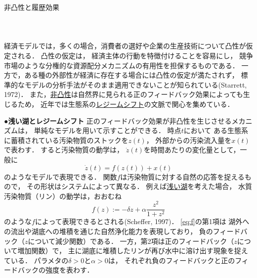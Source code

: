 \documentclass[11pt,a4paper]{article}
\begin{document}
\clearpage
\noindent
非凸性と履歴効果\\
\ \\
\ \\
\ \\

経済モデルでは，多くの場合，消費者の選好や企業の生産技術について凸性が仮定される．
凸性の仮定は，
経済主体の行動を特徴付けることを容易にし，
競争市場のような分権的な資源配分メカニズムの有用性を担保するものである．
一方で，ある種の外部性が経済に存在する場合には凸性の仮定が満たされず，
標準的なモデルの分析手法がそのまま適用できないことが知られている(Starrett, 1972)．
また，\underline{非凸性}は自然界に見られる正のフィードバック効果によっても生じるため，
近年では生態系の\underline{レジームシフト}の文脈で関心を集めている．

\noindent\textbf{●浅い湖とレジームシフト}\hspace{0.5em}
正のフィードバック効果が非凸性を生じさせるメカニズムは，
単純なモデルを用いて示すことができる．
時点$t$において
ある生態系に蓄積されている汚染物質のストックを$z(t)$，
外部からの汚染流入量を$x(t)$で表わす．
すると汚染物質の動学は，
$\dot{z}(t)$を時間あたりの変化量として，一般に
\begin{equation}\label{eq:z}%
  \dot{z}(t) = f(z(t)) + x(t)
\end{equation}
のようなモデルで表現できる．
関数$f$は汚染物質に対する自然の応答を捉えるもので，
その形状はシステムによって異なる．
例えば\underline{浅い湖}を考えた場合，
水質汚染物質（リン）の動学は，おおむね
\begin{equation}\label{eq:f}%
  f(z) := -\delta z + \alpha\frac{z^{2}}{1+z^{2}}
\end{equation}
のような$f$によって表現できるとされる(Scheffer, 1997)．
\eqref{eq:f}の第1項は
湖外への流出や湖底への堆積を通じた自然浄化能力を表現しており，
負のフィードバック（$z$について減少関数）である．
一方，第2項は正のフィードバック（$z$について増加関数）で，
主に湖底に堆積したリンが再び水中に溶け出す現象を捉えている．
パラメタの$\delta >0$と$\alpha >0$は，
それぞれ負のフィードバックと正のフィードバックの強度を表わす．
\end{document}
